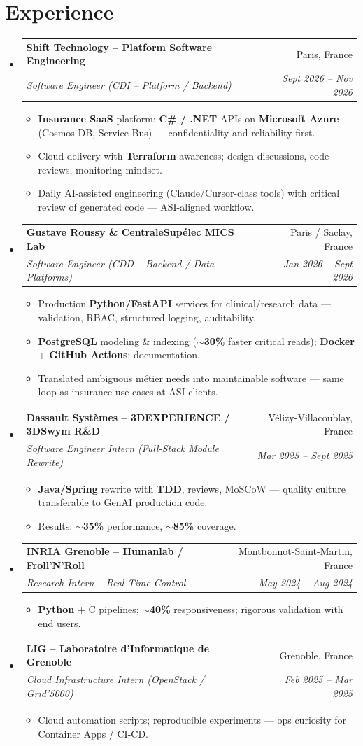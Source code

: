 \documentclass[letterpaper,10.5pt]{article}
\makeatletter
\newcommand{\resumeItem}[1]{\item\small{#1 \vspace{-1.5pt}}}
\newcommand{\resumeSubheading}[4]{\vspace{-1pt}\item\begin{tabular*}{0.97\textwidth}[t]{l@{\extracolsep{\fill}}r}\textbf{#1} & #2 \\\textit{\small#3} & \textit{\small #4} \\\end{tabular*}\vspace{-5pt}}
\newcommand{\resumeSubHeadingListStart}{\begin{itemize}[leftmargin=0.15in, label={}]}
\newcommand{\resumeSubHeadingListEnd}{\end{itemize}}
\newcommand{\resumeItemListStart}{\begin{itemize}[leftmargin=0.18in]}
\newcommand{\resumeItemListEnd}{\end{itemize}\vspace{-3pt}}
\makeatother
\begin{document}
\section{Experience}
\resumeSubHeadingListStart
  \resumeSubheading
    {Shift Technology -- Platform Software Engineering}{Paris, France}
    {Software Engineer (CDI -- Platform / Backend)}{Sept 2026 -- Nov 2026}
    \resumeItemListStart
      \resumeItem{\textbf{Insurance SaaS} platform: \textbf{C\# / .NET} APIs on \textbf{Microsoft Azure} (Cosmos DB, Service Bus) --- confidentiality and reliability first.}
      \resumeItem{Cloud delivery with \textbf{Terraform} awareness; design discussions, code reviews, monitoring mindset.}
      \resumeItem{Daily AI-assisted engineering (Claude/Cursor-class tools) with critical review of generated code --- ASI-aligned workflow.}
    \resumeItemListEnd
  \resumeSubheading
    {Gustave Roussy \& CentraleSup\'elec MICS Lab}{Paris / Saclay, France}
    {Software Engineer (CDD -- Backend / Data Platforms)}{Jan 2026 -- Sept 2026}
    \resumeItemListStart
      \resumeItem{Production \textbf{Python/FastAPI} services for clinical/research data --- validation, RBAC, structured logging, auditability.}
      \resumeItem{\textbf{PostgreSQL} modeling \& indexing (\textbf{$\sim$30\%} faster critical reads); \textbf{Docker} + \textbf{GitHub Actions}; documentation.}
      \resumeItem{Translated ambiguous m\'etier needs into maintainable software --- same loop as insurance use-cases at ASI clients.}
    \resumeItemListEnd
  \resumeSubheading
    {Dassault Syst\`emes -- 3DEXPERIENCE / 3DSwym R\&D}{V\'elizy-Villacoublay, France}
    {Software Engineer Intern (Full-Stack Module Rewrite)}{Mar 2025 -- Sept 2025}
    \resumeItemListStart
      \resumeItem{\textbf{Java/Spring} rewrite with \textbf{TDD}, reviews, MoSCoW --- quality culture transferable to GenAI production code.}
      \resumeItem{Results: \textbf{$\sim$35\%} performance, \textbf{$\sim$85\%} coverage.}
    \resumeItemListEnd
  \resumeSubheading
    {INRIA Grenoble -- Humanlab / Froll'N'Roll}{Montbonnot-Saint-Martin, France}
    {Research Intern -- Real-Time Control}{May 2024 -- Aug 2024}
    \resumeItemListStart
      \resumeItem{\textbf{Python} + C pipelines; \textbf{$\sim$40\%} responsiveness; rigorous validation with end users.}
    \resumeItemListEnd
  \resumeSubheading
    {LIG -- Laboratoire d'Informatique de Grenoble}{Grenoble, France}
    {Cloud Infrastructure Intern (OpenStack / Grid'5000)}{Feb 2025 -- Mar 2025}
    \resumeItemListStart
      \resumeItem{Cloud automation scripts; reproducible experiments --- ops curiosity for Container Apps / CI-CD.}
    \resumeItemListEnd
\resumeSubHeadingListEnd
\end{document}
